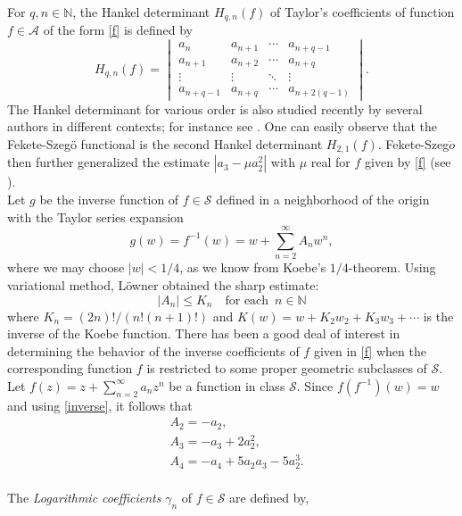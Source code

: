 \documentclass[a4paper,12pt]{amsart}
\theoremstyle{definition}
\numberwithin{equation}{section}
\begin{document}
For $q,n \in \mathbb{N}$, the Hankel determinant $H_{q,n}(f)$ of Taylor’s coefficients of function $f \in \mathcal{A}$ of the form \eqref{f} is defined by
$$
H_{q,n}(f) =
\begin{vmatrix}
	a_n & a_{n+1}  & \cdots & a_{n+q-1} \\ 
	a_{n+1} & a_{n+2}  & \cdots & a_{n+q} \\
	\vdots & \vdots &  \ddots &\vdots \\
	a_{n+q-1} & a_{n+q}  & \cdots & a_{n+2(q-1)}
\end{vmatrix}.
$$
The Hankel determinant for various order is also studied recently by several authors in different contexts;
for instance see \cite{Pom66,Pom67,ALT}.
One can easily observe that the Fekete-Szeg\"{o} functional is the second Hankel determinant $H_{2,1}(f)$. Fekete-Szeg$\ddot{o}$  then
further generalized the estimate $|a_3 - \mu a_2
^2|$ with $\mu$ real for $f$ given by \eqref{f} (see \cite[Theorem 3.8]{Duren-book-1983}). \\[2mm]
Let $g$ be the inverse function of $f\in \mathcal{S}$  defined in a neighborhood of the
origin with the Taylor series expansion
\begin{equation}\label{inverse}
g(w)=f^{-1}(w)=w+\sum_{n=2}^{\infty}A_n w^n,
\end{equation}
where we may choose $|w| < 1/4$, as we know from Koebe’s $1/4$-theorem. Using
 variational method, L\"{o}wner \cite{Lowner} obtained the sharp estimate:
$$
|A_n| \leq K_n  \quad \text{for each}\,\,\, n \in \mathbb{N}$$
where $K_n = (2n)!/(n!(n + 1)!)$ and $K(w) = w + K_2w_2 + K_3w_3 + \cdots $ is the
inverse of the Koebe function. There has been a good deal of interest in determining the behavior of the inverse coefficients of $f$ given in \eqref{f} when the
corresponding function $f$ is restricted to some proper geometric subclasses
of $\mathcal{S}$.\\[2mm]
Let $f(z)= z+\sum_{n=2}^{\infty}a_n z^n $ be a function in  class $\mathcal{S}$. Since $f(f^{-1})(w)=w$ and using \eqref{inverse}, it follows that
\begin{equation}\label{inversetaylor}
\begin{aligned}
& A_{2}=-a_2,\\[2mm]
& A_{3}=-a_3+2a_2^2,\\[2mm]
& A_{4}=-a_4+5a_2a_3-5a_2^3.
\end{aligned}
\end{equation}
\\[2mm]
The {\it Logarithmic coefficients} $\gamma_{n}$ of $f\in \mathcal{S}$ are defined by,
\end{document}
